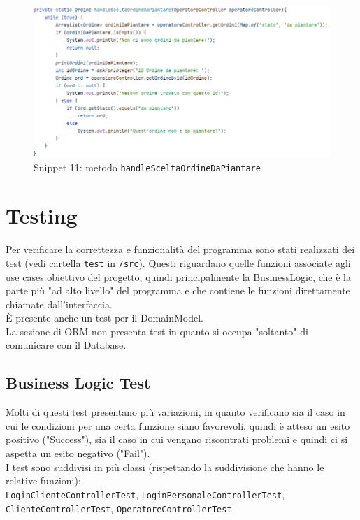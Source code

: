 \documentclass{article}
\newcommand{\code}[1]{\texttt{#1}}
\begin{document}
\begin{figure}[H]
    \centering
    \includegraphics[scale=0.5]{resources/images/Snippets/snippet_handlesceltaordinedapiantare.png}
    \captionsetup{labelformat=empty,labelsep=none}
    \caption{Snippet 11: metodo \code{handleSceltaOrdineDaPiantare}}
    \label{fig:snippet_handlesceltaordinedapiantare}
\end{figure}


\section{Testing}
Per verificare la correttezza e funzionalità del programma sono stati realizzati dei test (vedi cartella \code{test} in \code{/src}). Questi riguardano quelle funzioni associate agli use cases obiettivo del progetto, quindi principalmente la BusinessLogic, che è la parte più "ad alto livello" del programma e che contiene le funzioni direttamente chiamate dall'interfaccia. \\
È presente anche un test per il DomainModel.\\
La sezione di ORM non presenta test in quanto si occupa "soltanto" di comunicare con il Database.

\subsection{Business Logic Test}
Molti di questi test presentano più variazioni, in quanto verificano sia il caso in cui le condizioni per una certa funzione siano favorevoli, quindi è atteso un esito positivo ("Success"), sia il caso in cui vengano riscontrati problemi e quindi ci si aspetta un esito negativo ("Fail").\\
I test sono suddivisi in più classi (rispettando la suddivisione che hanno le relative funzioni): \\
\code{LoginClienteControllerTest}, \code{LoginPersonaleControllerTest}, \code{ClienteControllerTest}, \code{OperatoreControllerTest}.
\end{document}
